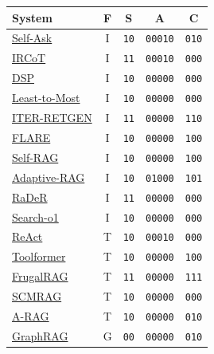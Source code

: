 \documentclass[11pt]{article}
\begin{document}
\begin{center}
\footnotesize
{}
\label{tab:corpus-codes}
\setlength{\tabcolsep}{4pt}
\begin{tabular}{@{}lcccc@{}}
\toprule
\textbf{System} & \textbf{F} & \textbf{S} & \textbf{A} & \textbf{C} \\
\midrule
\href{https://arxiv.org/abs/2210.03350}{Self-Ask} & I & \texttt{10} & \texttt{00010} & \texttt{010} \\
\href{https://arxiv.org/abs/2212.10509}{IRCoT} & I & \texttt{11} & \texttt{00010} & \texttt{000} \\
\href{https://arxiv.org/abs/2212.14024}{DSP} & I & \texttt{10} & \texttt{00000} & \texttt{000} \\
\href{https://arxiv.org/abs/2205.10625}{Least-to-Most} & I & \texttt{10} & \texttt{00000} & \texttt{000} \\
\href{https://arxiv.org/abs/2305.15294}{ITER-RETGEN} & I & \texttt{11} & \texttt{00000} & \texttt{110} \\
\href{https://arxiv.org/abs/2305.06983}{FLARE} & I & \texttt{10} & \texttt{00000} & \texttt{100} \\
\href{https://arxiv.org/abs/2310.11511}{Self-RAG} & I & \texttt{10} & \texttt{00000} & \texttt{100} \\
\href{https://arxiv.org/abs/2403.14403}{Adaptive-RAG} & I & \texttt{10} & \texttt{01000} & \texttt{101} \\
\href{https://aclanthology.org/2025.emnlp-main.1011/}{RaDeR} & I & \texttt{11} & \texttt{00000} & \texttt{000} \\
\href{https://arxiv.org/abs/2501.05366}{Search-o1} & I & \texttt{10} & \texttt{00000} & \texttt{000} \\
\href{https://arxiv.org/abs/2210.03629}{ReAct} & T & \texttt{10} & \texttt{00010} & \texttt{000} \\
\href{https://arxiv.org/abs/2302.04761}{Toolformer} & T & \texttt{10} & \texttt{00000} & \texttt{100} \\
\href{https://arxiv.org/abs/2507.07634}{FrugalRAG} & T & \texttt{11} & \texttt{00000} & \texttt{111} \\
\href{https://www.ifaamas.org/Proceedings/aamas2025/pdfs/p50.pdf}{SCMRAG} & T & \texttt{10} & \texttt{00000} & \texttt{000} \\
\href{https://arxiv.org/abs/2602.03442}{A-RAG} & T & \texttt{10} & \texttt{00000} & \texttt{010} \\
\href{https://arxiv.org/abs/2404.16130}{GraphRAG} & G & \texttt{00} & \texttt{00000} & \texttt{010} \\
\bottomrule
\end{tabular}
\end{center}
\end{document}
